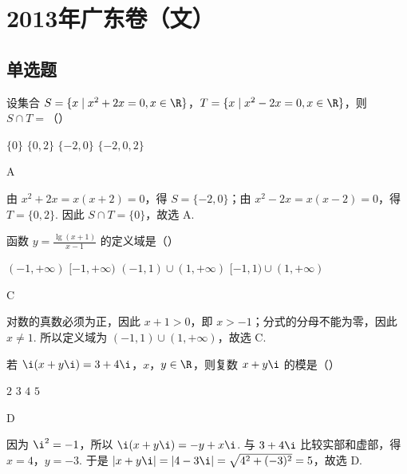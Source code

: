 \chapter{2013年广东卷（文）}

\section{单选题}

\begin{problem}
设集合 \(S = \{x \mid x^2 + 2x = 0, x \in \R\}\)，\(T = \{x \mid x^2 - 2x = 0, x \in \R\}\)，则 \(S \cap T =\)（\quad）

\choices
    {\( \{0\} \)}
    {\(\{0, 2\}\)}
    {\(\{-2, 0\}\)}
    {\(\{-2, 0, 2\}\)}
\end{problem}

\begin{answer}
A
\end{answer}

\begin{solution}
由 \(x^2+2x=x(x+2)=0\)，得 \(S=\{-2,0\}\)；由 \(x^2-2x=x(x-2)=0\)，得 \(T=\{0,2\}\). 因此 \(S\cap T=\{0\}\)，故选 A.
\end{solution}

\begin{problem}
函数 \( y = \frac{\lg(x + 1)}{x - 1} \) 的定义域是（\quad）

\choices
    {\( (-1,+\infty) \)}
    {\( [-1,+\infty) \)}
    {\( (-1,1)\cup(1,+\infty) \)}
    {\([-1, 1) \cup (1, +\infty)\)}
\end{problem}

\begin{answer}
C
\end{answer}

\begin{solution}
对数的真数必须为正，因此 \(x+1>0\)，即 \(x>-1\)；分式的分母不能为零，因此 \(x\neq1\). 所以定义域为 \((-1,1)\cup(1,+\infty)\)，故选 C.
\end{solution}

\begin{problem}
若 \(\i (x + y\i) = 3 + 4\i\)，\(x\)，\(y \in \R\)，则复数 \( x + y\i \) 的模是（\quad）

\choices
    {\(2\)}
    {\(3\)}
    {\(4\)}
    {\(5\)}
\end{problem}

\begin{answer}
D
\end{answer}

\begin{solution}
因为 \(\i^2=-1\)，所以 \(\i(x+y\i)=-y+x\i\). 与 \(3+4\i\) 比较实部和虚部，得 \(x=4\)，\(y=-3\). 于是 \(|x+y\i|=|4-3\i|=\sqrt{4^2+(-3)^2}=5\)，故选 D.
\end{solution}

